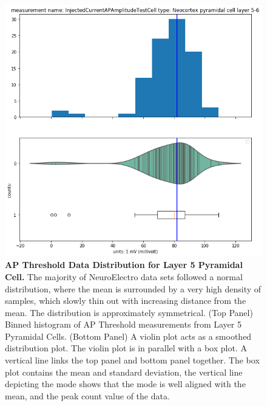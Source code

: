 \begin{figure} 
    \begin{center}
   \includegraphics[scale=0.8]{figures/mean_well_served.png}
   \caption[AP Threshold Data Distribution for Layer 5 Pyramidal Cell]{\textbf{AP Threshold Data Distribution for Layer 5 Pyramidal Cell.} The majority of NeuroElectro data sets followed a normal distribution, where the mean is surrounded by a very high density of samples, which slowly thin out with increasing distance from the mean. The distribution is approximately symmetrical. (Top Panel) Binned histogram of AP Threshold measurements from Layer 5 Pyramidal Cells. (Bottom Panel) A violin plot acts as a smoothed distribution plot. The violin plot is in parallel with a box plot. A vertical line links the top panel and bottom panel together. The box plot contains the mean and standard deviation, the vertical line depicting the mode shows that the mode is well aligned with the mean, and the peak count value of the data.}
   \label{fig:normal-feature}
    \end{center}
\end{figure}   

